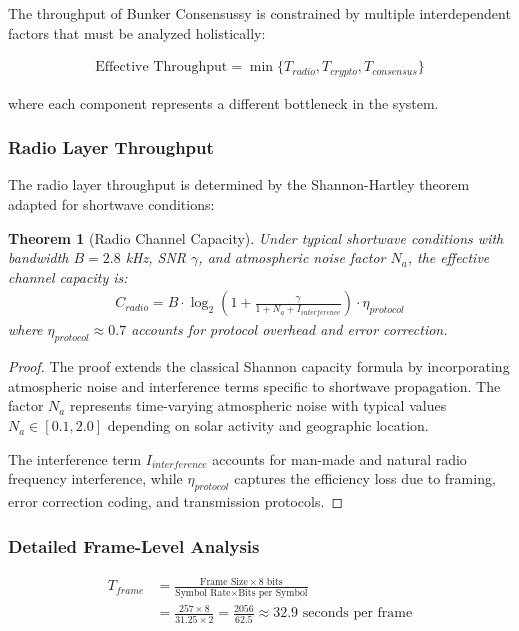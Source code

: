 \documentclass[11pt,a4paper]{article}
\newtheorem{theorem}{Theorem}[section]
\begin{document}
The throughput of Bunker Consensussy is constrained by multiple interdependent factors that must be analyzed holistically:

\begin{align}
\text{Effective Throughput} = \min\{T_{radio}, T_{crypto}, T_{consensus}\}
\end{align}

where each component represents a different bottleneck in the system.

\subsubsection{Radio Layer Throughput}

The radio layer throughput is determined by the Shannon-Hartley theorem adapted for shortwave conditions:

\begin{theorem}[Radio Channel Capacity]
Under typical shortwave conditions with bandwidth $B = 2.8$ kHz, SNR $\gamma$, and atmospheric noise factor $N_a$, the effective channel capacity is:
\begin{align}
C_{radio} = B \cdot \log_2\left(1 + \frac{\gamma}{1 + N_a + I_{interference}}\right) \cdot \eta_{protocol}
\end{align}
where $\eta_{protocol} \approx 0.7$ accounts for protocol overhead and error correction.
\end{theorem}

\begin{proof}
The proof extends the classical Shannon capacity formula by incorporating atmospheric noise and interference terms specific to shortwave propagation. The factor $N_a$ represents time-varying atmospheric noise with typical values $N_a \in [0.1, 2.0]$ depending on solar activity and geographic location.

The interference term $I_{interference}$ accounts for man-made and natural radio frequency interference, while $\eta_{protocol}$ captures the efficiency loss due to framing, error correction coding, and transmission protocols.
\end{proof}

\subsubsection{Detailed Frame-Level Analysis}

\begin{align}
T_{frame} &= \frac{\text{Frame Size} \times 8 \text{ bits}}{\text{Symbol Rate} \times \text{Bits per Symbol}}\\
&= \frac{257 \times 8}{31.25 \times 2} = \frac{2056}{62.5} \approx 32.9 \text{ seconds per frame}
\end{align}
\end{document}
